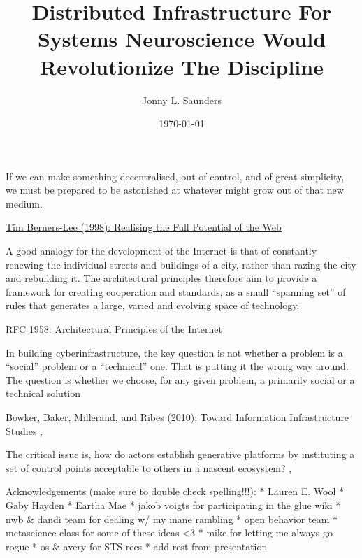 \documentclass{article}
\title{Distributed Infrastructure For Systems Neuroscience Would Revolutionize The Discipline}
\author{Jonny L. Saunders}
\date{\today}
\begin{document}
\maketitle
\tableofcontents
\clearpage
\begin{leftbar}
If we can make something decentralised, out of control, and of great
simplicity, we must be prepared to be astonished at whatever might grow
out of that new medium.

\href{https://www.w3.org/1998/02/Potential.html}{Tim Berners-Lee (1998):
Realising the Full Potential of the Web}
\end{leftbar}

\begin{leftbar}
A good analogy for the development of the Internet is that of constantly
renewing the individual streets and buildings of a city, rather than
razing the city and rebuilding it. The architectural principles
therefore aim to provide a framework for creating cooperation and
standards, as a small ``spanning set'' of rules that generates a large,
varied and evolving space of technology.

\href{https://datatracker.ietf.org/doc/html/rfc1958}{RFC 1958:
Architectural Principles of the Internet}
\end{leftbar}

\begin{leftbar}
In building cyberinfrastructure, the key question is not whether a
problem is a ``social'' problem or a ``technical'' one. That is putting
it the wrong way around. The question is whether we choose, for any
given problem, a primarily social or a technical solution

\href{https://doi.org/10.1007/978-1-4020-9789-8_5}{Bowker, Baker,
Millerand, and Ribes (2010): Toward Information Infrastructure Studies}
\cite{bowkerInformationInfrastructureStudies2010},\end{leftbar}
\begin{leftbar}
The critical issue is, how do actors establish generative platforms by
instituting a set of control points acceptable to others in a nascent
ecosystem? \cite{tilsonDigitalInfrastructuresMissing2010},\end{leftbar}
Acknowledgements (make sure to double check spelling!!!): * Lauren E.
Wool * Gaby Hayden * Eartha Mae * jakob voigts for participating in the
glue wiki * nwb \& dandi team for dealing w/ my inane rambling * open
behavior team * metascience class for some of these ideas \textless3 *
mike for letting me always go rogue * os \& avery for STS recs * add
rest from presentation
\end{document}
